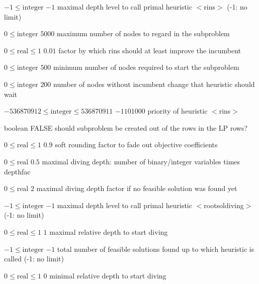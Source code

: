 %
{$-1\leq\textrm{integer}$}%
{$-1$}%
{maximal depth level to call primal heuristic $<$rins$>$ (-1: no limit)}%
{}

%
{$0\leq\textrm{integer}$}%
{$5000$}%
{maximum number of nodes to regard in the subproblem}%
{}

%
{$0\leq\textrm{real}\leq1$}%
{$0.01$}%
{factor by which rins should at least improve the incumbent}%
{}

%
{$0\leq\textrm{integer}$}%
{$500$}%
{minimum number of nodes required to start the subproblem}%
{}

%
{$0\leq\textrm{integer}$}%
{$200$}%
{number of nodes without incumbent change that heuristic should wait}%
{}

%
{$-536870912\leq\textrm{integer}\leq536870911$}%
{$-1101000$}%
{priority of heuristic $<$rins$>$}%
{}

%
{boolean}%
{FALSE}%
{should subproblem be created out of the rows in the LP rows?}%
{}

%
{$0\leq\textrm{real}\leq1$}%
{$0.9$}%
{soft rounding factor to fade out objective coefficients}%
{}

%
{$0\leq\textrm{real}$}%
{$0.5$}%
{maximal diving depth: number of binary/integer variables times depthfac}%
{}

%
{$0\leq\textrm{real}$}%
{$2$}%
{maximal diving depth factor if no feasible solution was found yet}%
{}

%
{$-1\leq\textrm{integer}$}%
{$-1$}%
{maximal depth level to call primal heuristic $<$rootsoldiving$>$ (-1: no limit)}%
{}

%
{$0\leq\textrm{real}\leq1$}%
{$1$}%
{maximal relative depth to start diving}%
{}

%
{$-1\leq\textrm{integer}$}%
{$-1$}%
{total number of feasible solutions found up to which heuristic is called (-1: no limit)}%
{}

%
{$0\leq\textrm{real}\leq1$}%
{$0$}%
{minimal relative depth to start diving}%
{}

